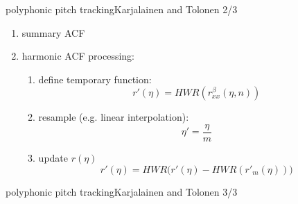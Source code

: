 	\begin{frame}{polyphonic pitch tracking}{Karjalainen and Tolonen 2/3}
		\begin{enumerate}
			\item	summary ACF
			\pause
			\item	harmonic ACF processing:
				\begin{enumerate}
					\item	define temporary function:
						\begin{equation*}
							r'(\eta) = HWR(r_{xx}^\beta (\eta,n)) 
						\end{equation*}
					\pause
					\item	resample (e.g. linear interpolation):
						\begin{equation*}
							\eta' = \frac{\eta}{m}
						\end{equation*}
					\pause
					\item	update $r(\eta)$
						\begin{equation*}
							r'(\eta) = HWR\big(r'(\eta) - HWR(r'_m(\eta))\big) 
						\end{equation*}
				\end{enumerate}
		\end{enumerate}
	\end{frame}
	
	\begin{frame}{polyphonic pitch tracking}{Karjalainen and Tolonen 3/3}
	\end{frame}
	
